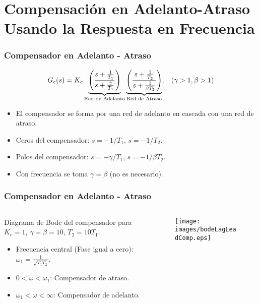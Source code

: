 \documentclass[aspectratio=169, handout]{beamer}
\theoremstyle{definition}
\theoremstyle{plain}
\theoremstyle{remark}
\begin{document}
\section{Compensación en Adelanto-Atraso Usando la Respuesta en Frecuencia}
\begin{frame}[<+->]\frametitle{Compensador en Adelanto - Atraso}
	\begin{equation*}
		G_c(s) = K_c  \underbrace{\left(\frac{s+\frac{1}{T_1}}{s+\frac{\gamma}{T_1}}\right)}_{\text{Red de Adelanto}}  \underbrace{\left(\frac{s+\frac{1}{T_2}}{s+\frac{1}{\beta T_2}}\right)}_{\text{Red de Atraso}}, \hspace*{3mm} (\gamma > 1, \beta > 1)
	\end{equation*}
	\begin{itemize}
		\item El compensador se forma por una red de adelanto en cascada con una red de atraso.
		\item Ceros del compensador: $s = -1/T_1$, $s = -1/T_2$.
		\item Polos del compensador: $s = -\gamma/T_1$, $s = -1/\beta T_2$.
		\item Con frecuencia se toma $\gamma = \beta$ (no es necesario).
	\end{itemize}
\end{frame}

\begin{frame}[<+->]\frametitle{Compensador en Adelanto - Atraso}
	\begin{columns}
		\begin{column}{0.4\textwidth}
			Diagrama de Bode del compensador para $K_c = 1$, $\gamma = \beta = 10$, $T_2 = 10 T_1$.
			\begin{itemize}
				\item Frecuencia central (Fase igual a cero): $\omega_1 = \frac{1}{\sqrt{T_1 T_2}}$.
				\item $0 < \omega < \omega_1$: Compensador de atraso.
				\item $\omega_1 < \omega < \infty$: Compensador de adelanto.
			\end{itemize}
		\end{column}	
		\begin{column}{0.6\textwidth}
		\begin{figure}
			\centering
			\texttt{[image: images/bodeLagLeadComp.eps]}
		\end{figure}
		\end{column}	
	\end{columns}
\end{frame}
\end{document}
